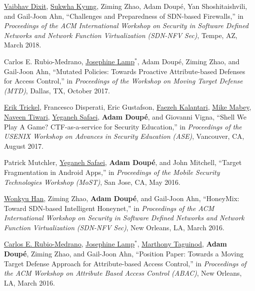 \documentclass[11pt,letterpaper,sans]{moderncv}
\begin{document}
\begin{etaremune}

\item \underline{Vaibhav Dixit}, \underline{Sukwha Kyung}, Ziming
  Zhao, Adam Doupé, Yan Shoshitaishvili, and Gail-Joon Ahn,
  ``Challenges and Preparedness of SDN-based Firewalls,'' in
  \emph{Proceedings of the ACM International Workshop on Security in
    Software Defined Networks and Network Function Virtualization
    (SDN-NFV Sec)}, Tempe, AZ, March 2018. 

\item Carlos E. Rubio-Medrano, \underline{Josephine Lamp}$^*$, Adam
  Doup\'e, Ziming Zhao, and Gail-Joon Ahn, ``Mutated Policies: Towards
  Proactive Attribute-based Defenses for Access Control,'' in
  \emph{Proceedings of the Workshop on Moving Target Defense (MTD)},
  Dallas, TX, October 2017. 

\item \underline{Erik Trickel}, Francesco Disperati, Eric Gustafson,
  \underline{Faezeh Kalantari}, \underline{Mike Mabey},
  \underline{Naveen Tiwari}, \underline{Yeganeh Safaei}, \textbf{Adam
    Doup\'e}, and Giovanni Vigna, ``Shell We Play A Game?
  CTF-as-a-service for Security Education,'' in \emph{Proceedings of
    the USENIX Workshop on Advances in Security Education (ASE)},
  Vancouver, CA, August 2017.
      
\item Patrick Mutchler, \underline{Yeganeh Safaei}, \textbf{Adam
  Doup\'e}, and John Mitchell, ``Target Fragmentation in Android
  Apps,'' in \emph{Proceedings of the Mobile Security Technologies
    Workshop (MoST)}, San Jose, CA, May 2016.

\item \underline{Wonkyu Han}, Ziming Zhao, \textbf{Adam Doup\'e}, and
  Gail-Joon Ahn, ``HoneyMix: Toward SDN-based Intelligent Honeynet,''
  in \emph{Proceedings of the ACM International Workshop on Security
    in Software Defined Networks and Network Function Virtualization
    (SDN-NFV Sec)}, New Orleans, LA, March 2016.

\item \underline{Carlos E. Rubio-Medrano}, \underline{Josephine
  Lamp}$^*$, \underline{Marthony Taguinod}, \textbf{Adam Doup\'e},
  Ziming Zhao, and Gail-Joon Ahn, ``Position Paper: Towards a Moving
  Target Defense Approach for Attribute-based Access Control,'' in
  \emph{Proceedings of the ACM Workshop on Attribute Based Access
    Control (ABAC)}, New Orleans, LA, March 2016.


\end{etaremune}
\end{document}
